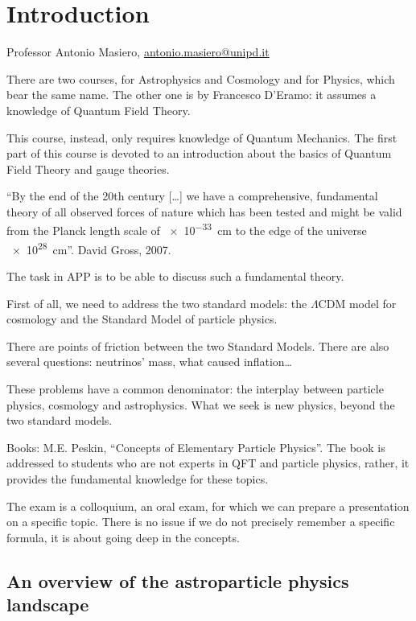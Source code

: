 \documentclass[main.tex]{subfiles}
\begin{document}

\section{Introduction}

Professor Antonio Masiero, \url{antonio.masiero@unipd.it}

There are two courses, for Astrophysics and Cosmology and for Physics, which bear the same name. 
The other one is by Francesco D'Eramo: it assumes a knowledge of Quantum Field Theory. 

This course, instead, only requires knowledge of Quantum Mechanics. 
The first part of this course is devoted to an introduction about the basics of Quantum Field Theory and gauge theories.

``By the end of the 20th century [\dots] we have a comprehensive, fundamental theory of all observed forces of nature which has been tested and might be valid from the Planck length scale of \SI{e-33}{cm} to the edge of the universe \SI{e28}{cm}''. David Gross, 2007. 

The task in APP is to be able to discuss such a fundamental theory. 

First of all, we need to address the two standard models: the \(\Lambda \)CDM model for cosmology and the Standard Model of particle physics.

There are points of friction between the two Standard Models.
There are also several questions: neutrinos' mass, what caused inflation\dots 

These problems have a common denominator: the interplay between particle physics, cosmology and astrophysics.
What we seek is new physics, beyond the two standard models. 

Books: M.E. Peskin, ``Concepts of Elementary Particle Physics''. The book is addressed to students who are not experts in QFT and particle physics, rather, it provides the fundamental knowledge for these topics.

The exam is a colloquium, an oral exam, for which we can prepare a presentation on a specific topic. 
There is no issue if we do not precisely remember a specific formula, it is about going deep in the concepts.

\subsection{An overview of the astroparticle physics landscape}
\end{document}
